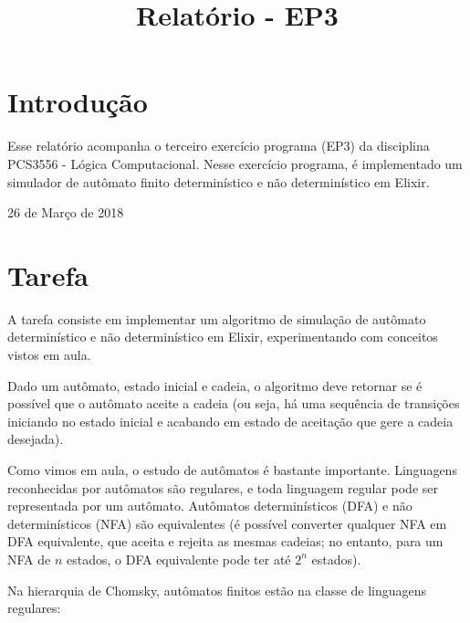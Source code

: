 \documentclass[conference]{IEEEtran}
\begin{document}
\title{Relatório - EP3}

\author{
}

\maketitle

\section{Introdução}
Esse relatório acompanha o terceiro exercício programa (EP3) da disciplina PCS3556 - Lógica Computacional. Nesse exercício programa, é implementado um simulador de autômato finito determinístico e não determinístico em Elixir.

\hfill 26 de Março de 2018

\section{Tarefa}

A tarefa consiste em implementar um algoritmo de simulação de autômato determinístico e não determinístico em Elixir, experimentando com conceitos vistos em aula.

Dado um autômato, estado inicial e cadeia, o algoritmo deve retornar se é possível que o autômato aceite a cadeia (ou seja, há uma sequência de transições iniciando no estado inicial e acabando em estado de aceitação que gere a cadeia desejada).

Como vimos em aula, o estudo de autômatos é bastante importante. Linguagens reconhecidas por autômatos são regulares, e toda linguagem regular pode ser representada por um autômato. Autômatos determinísticos (DFA) e não determinísticos (NFA) são equivalentes (é possível converter qualquer NFA em DFA equivalente, que aceita e rejeita as mesmas cadeias; no entanto, para um NFA de $n$ estados, o DFA equivalente pode ter até $2^n$ estados).

Na hierarquia de Chomsky, autômatos finitos estão na classe de linguagens regulares:
\end{document}
